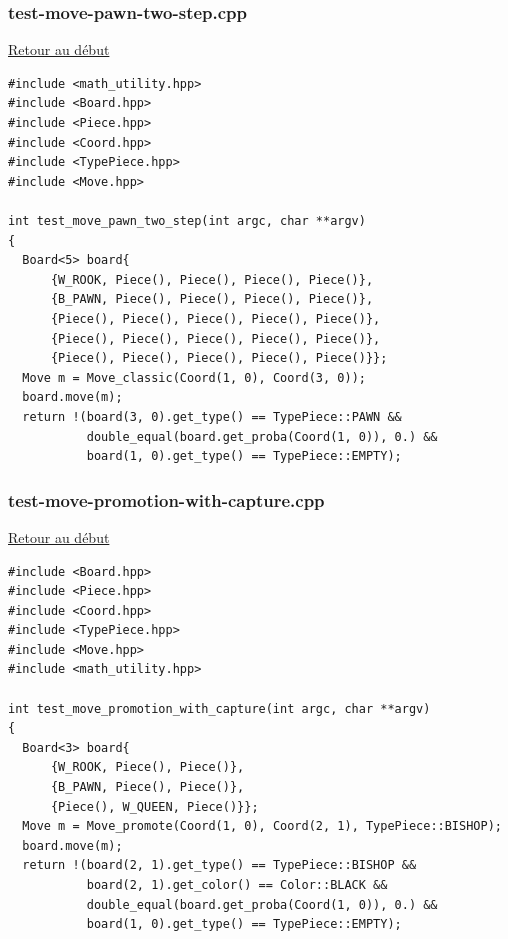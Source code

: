 {\begin{frame}[fragile]
\begin{verbatim}
\end{verbatim}
\end{frame}

\begin{frame}[fragile]
\label{testmovepawntwostep.cpp}
\frametitle{test-move-pawn-two-step.cpp}
\hyperlink{conclusion}{Retour au début}\newline
\begin{verbatim}
#include <math_utility.hpp>
#include <Board.hpp>
#include <Piece.hpp>
#include <Coord.hpp>
#include <TypePiece.hpp>
#include <Move.hpp>

int test_move_pawn_two_step(int argc, char **argv)
{
  Board<5> board{
      {W_ROOK, Piece(), Piece(), Piece(), Piece()},
      {B_PAWN, Piece(), Piece(), Piece(), Piece()},
      {Piece(), Piece(), Piece(), Piece(), Piece()},
      {Piece(), Piece(), Piece(), Piece(), Piece()},
      {Piece(), Piece(), Piece(), Piece(), Piece()}};
  Move m = Move_classic(Coord(1, 0), Coord(3, 0));
  board.move(m);
  return !(board(3, 0).get_type() == TypePiece::PAWN &&
           double_equal(board.get_proba(Coord(1, 0)), 0.) &&
           board(1, 0).get_type() == TypePiece::EMPTY);

\end{verbatim}
\end{frame}

\begin{frame}[fragile]
\label{testmovepromotionwithcapture.cpp}
\frametitle{test-move-promotion-with-capture.cpp}
\hyperlink{conclusion}{Retour au début}\newline
\begin{verbatim}
#include <Board.hpp>
#include <Piece.hpp>
#include <Coord.hpp>
#include <TypePiece.hpp>
#include <Move.hpp>
#include <math_utility.hpp>

int test_move_promotion_with_capture(int argc, char **argv)
{
  Board<3> board{
      {W_ROOK, Piece(), Piece()},
      {B_PAWN, Piece(), Piece()},
      {Piece(), W_QUEEN, Piece()}};
  Move m = Move_promote(Coord(1, 0), Coord(2, 1), TypePiece::BISHOP);
  board.move(m);
  return !(board(2, 1).get_type() == TypePiece::BISHOP &&
           board(2, 1).get_color() == Color::BLACK &&
           double_equal(board.get_proba(Coord(1, 0)), 0.) &&
           board(1, 0).get_type() == TypePiece::EMPTY);

\end{verbatim}
\end{frame}

}
